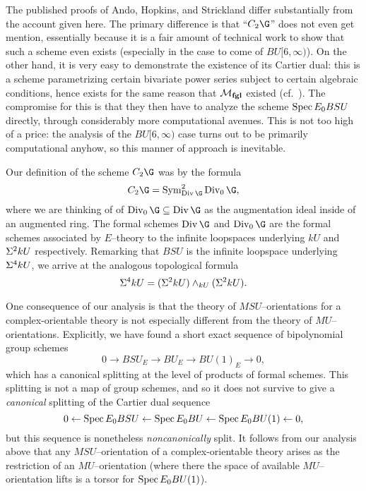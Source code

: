 \begin{remark}\label{CUpper3Exists}
The published proofs of Ando, Hopkins, and Strickland differ substantially from the account given here.  The primary difference is that ``$C_2 \G$'' does not even get mention, essentially because it is a fair amount of technical work to show that such a scheme even exists (especially in the case to come of $BU[6, \infty)$).  On the other hand, it is very easy to demonstrate the existence of its Cartier dual: this is a scheme parametrizing certain bivariate power series subject to certain algebraic conditions, hence exists for the same reason that $\mathcal{M}_{\mathbf{fgl}}$ existed (cf.\ ).  The compromise for this is that they then have to analyze the scheme $\operatorname{Spec} E_0 BSU$ directly, through considerably more computational avenues.  This is not too high of a price: the analysis of the $BU[6, \infty)$ case turns out to be primarily computational anyhow, so this manner of approach is inevitable.
\end{remark}

\begin{remark}
Our definition of the scheme $C_2 \G$ was by the formula \[C_2 \G = \Sym^2_{\Div \G} \Div_0 \G,\] where we are thinking of of $\Div_0 \G \subseteq \Div \G$ as the augmentation ideal inside of an augmented ring.  The formal schemes $\Div \G$ and $\Div_0 \G$ are the formal schemes associated by $E$--theory to the infinite loopspaces underlying $kU$ and $\Sigma^2 kU$ respectively.  Remarking that $BSU$ is the infinite loopspace underlying $\Sigma^4 kU$, we arrive at the analogous topological formula \[\Sigma^4 kU = (\Sigma^2 kU) \wedge_{kU} (\Sigma^2 kU).\]
\end{remark}

\begin{remark}
One consequence of our analysis is that the theory of $MSU$--orientations for a complex-orientable theory is not especially different from the theory of $MU$--orientations.  Explicitly, we have found a short exact sequence of bipolynomial group schemes \[0 \to BSU_E \to BU_E \to BU(1)_E \to 0,\] which has a canonical splitting at the level of products of formal schemes.  This splitting is not a map of group schemes, and so it does not survive to give a \emph{canonical} splitting of the Cartier dual sequence \[0 \leftarrow \operatorname{Spec} E_0 BSU \leftarrow \operatorname{Spec} E_0 BU \leftarrow \operatorname{Spec} E_0 BU(1) \leftarrow 0,\] but this sequence is nonetheless \emph{noncanonically} split.  It follows from our analysis above that any $MSU$--orientation of a complex-orientable theory arises as the restriction of an $MU$--orientation (where there the space of available $MU$--orientation lifts is a torsor for $\operatorname{Spec} E_0 BU(1)$).
\end{remark}












